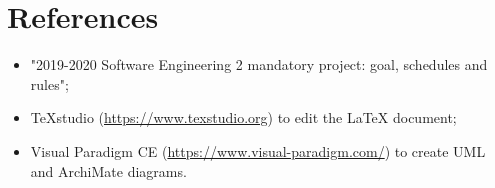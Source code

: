 \documentclass{article}
\begin{document}
	\clearpage
	\section{References}
		\begin{itemize}
			\item "2019-2020 Software Engineering 2 mandatory project: goal, schedules and rules";
			\item TeXstudio (\url{https://www.texstudio.org}) to edit the LaTeX document;
			\item Visual Paradigm CE (\url{https://www.visual-paradigm.com/}) to create UML and ArchiMate diagrams.
		\end{itemize} 
	
\end{document}
